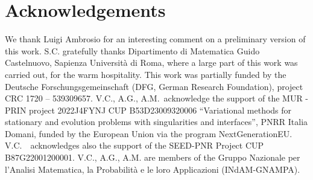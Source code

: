 \documentclass[a4paper,reqno]{amsart}
\theoremstyle{remark}
\numberwithin{equation}{section}
\begin{document}
\section*{Acknowledgements}
We thank Luigi Ambrosio for an interesting comment on a preliminary version of this work. S.C. gratefully
thanks Dipartimento di Matematica Guido Castelnuovo, Sapienza Università di Roma, where a large part of this work was carried out, for the warm hospitality. 
This work was partially funded by the Deutsche Forschungsgemeinschaft (DFG,
German Research Foundation), project CRC 1720 -- 539309657.
V.C., A.G., A.M.~acknowledge the support of the MUR - PRIN project 2022J4FYNJ CUP B53D23009320006 ``Variational methods for stationary and evolution problems with singularities and interfaces'', PNRR Italia Domani, funded by the European Union via the program NextGenerationEU. V.C.\ ~acknowledges also the support of the SEED-PNR Project CUP B87G22001200001.  V.C., A.G., A.M. are members of the Gruppo Nazionale per l'Analisi Matematica, la Probabilità e le loro Applicazioni (INdAM-GNAMPA). 
\end{document}
